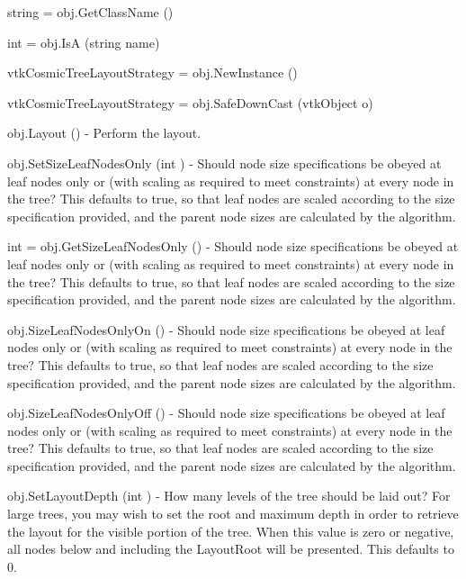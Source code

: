 \begin{DoxyItemize}
\item {\ttfamily string = obj.\-Get\-Class\-Name ()}  
\item {\ttfamily int = obj.\-Is\-A (string name)}  
\item {\ttfamily vtk\-Cosmic\-Tree\-Layout\-Strategy = obj.\-New\-Instance ()}  
\item {\ttfamily vtk\-Cosmic\-Tree\-Layout\-Strategy = obj.\-Safe\-Down\-Cast (vtk\-Object o)}  
\item {\ttfamily obj.\-Layout ()} -\/ Perform the layout.  
\item {\ttfamily obj.\-Set\-Size\-Leaf\-Nodes\-Only (int )} -\/ Should node size specifications be obeyed at leaf nodes only or (with scaling as required to meet constraints) at every node in the tree? This defaults to true, so that leaf nodes are scaled according to the size specification provided, and the parent node sizes are calculated by the algorithm.  
\item {\ttfamily int = obj.\-Get\-Size\-Leaf\-Nodes\-Only ()} -\/ Should node size specifications be obeyed at leaf nodes only or (with scaling as required to meet constraints) at every node in the tree? This defaults to true, so that leaf nodes are scaled according to the size specification provided, and the parent node sizes are calculated by the algorithm.  
\item {\ttfamily obj.\-Size\-Leaf\-Nodes\-Only\-On ()} -\/ Should node size specifications be obeyed at leaf nodes only or (with scaling as required to meet constraints) at every node in the tree? This defaults to true, so that leaf nodes are scaled according to the size specification provided, and the parent node sizes are calculated by the algorithm.  
\item {\ttfamily obj.\-Size\-Leaf\-Nodes\-Only\-Off ()} -\/ Should node size specifications be obeyed at leaf nodes only or (with scaling as required to meet constraints) at every node in the tree? This defaults to true, so that leaf nodes are scaled according to the size specification provided, and the parent node sizes are calculated by the algorithm.  
\item {\ttfamily obj.\-Set\-Layout\-Depth (int )} -\/ How many levels of the tree should be laid out? For large trees, you may wish to set the root and maximum depth in order to retrieve the layout for the visible portion of the tree. When this value is zero or negative, all nodes below and including the Layout\-Root will be presented. This defaults to 0.  

\end{DoxyItemize}
